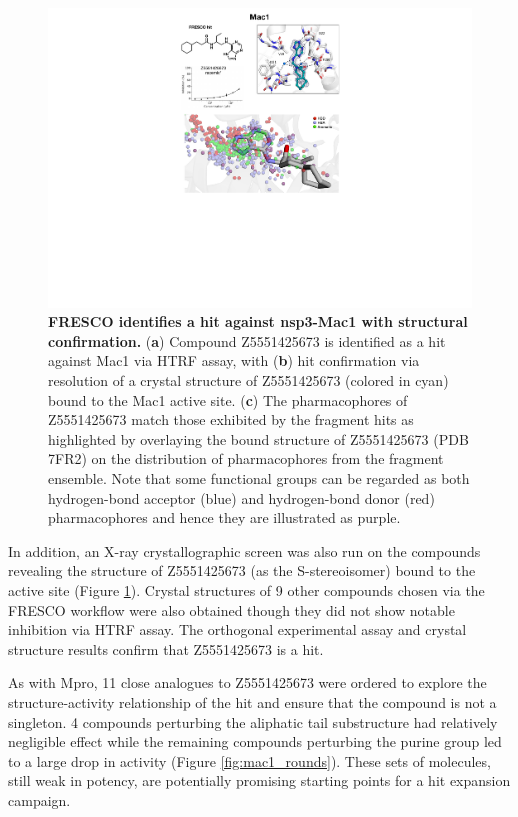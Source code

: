 \begin{figure}[!t]
 \centering
 \includegraphics[width=0.75\linewidth]{Chapters/Fresco/Figs/mac1_fig.pdf}
 \caption{\textbf{FRESCO identifies a hit against nsp3-Mac1 with structural confirmation.} (\textbf{a}) Compound Z5551425673 is identified as a hit against Mac1 via HTRF assay, with (\textbf{b}) hit confirmation via resolution of a crystal structure of Z5551425673 (colored in cyan) bound to the Mac1 active site. (\textbf{c}) The pharmacophores of Z5551425673 match those exhibited by the fragment hits as highlighted by overlaying the bound structure of Z5551425673 (PDB 7FR2) on the distribution of pharmacophores from the fragment ensemble. Note that some functional groups can be regarded as both hydrogen-bond acceptor (blue) and hydrogen-bond donor (red) pharmacophores and hence they are illustrated as purple.}
 \label{fig:mac1_hit}
\end{figure}

In addition, an X-ray crystallographic screen was also run on the compounds revealing the structure of Z5551425673 (as the S-stereoisomer) bound to the active site (Figure \ref{fig:mac1_hit}). Crystal structures of 9 other compounds chosen via the FRESCO workflow were also obtained though they did not show notable inhibition via HTRF assay. The orthogonal experimental assay and crystal structure results confirm that Z5551425673 is a hit. 

As with Mpro, 11 close analogues to Z5551425673 were ordered to explore the structure-activity relationship of the hit and ensure that the compound is not a singleton. 4 compounds perturbing the aliphatic tail substructure had relatively negligible effect while the remaining compounds perturbing the purine group led to a large drop in activity (Figure \ref{fig:mac1_rounds}). These sets of molecules, still weak in potency, are potentially promising starting points for a hit expansion campaign. 

